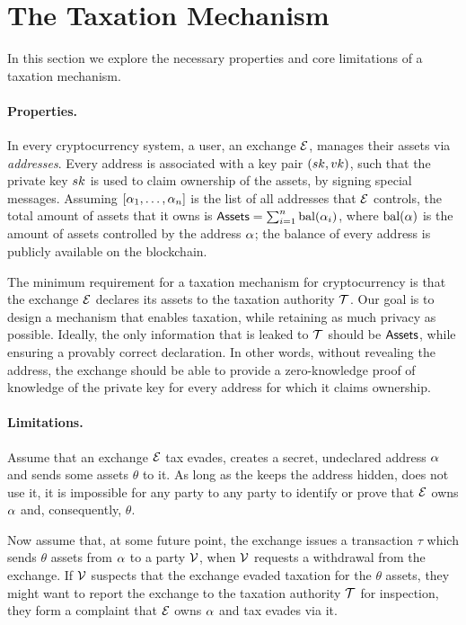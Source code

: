 \section{The Taxation Mechanism}\label{sec:taxation}

In this section we explore the necessary properties and core limitations of a
taxation mechanism.

\paragraph{Properties.}

In every cryptocurrency system, a user, \eg an exchange $\mathcal{E}$, manages
their assets via \emph{addresses}. Every address is associated with a key pair
$(sk, vk)$, such that the private key $sk$ is used to claim ownership of
the assets, \eg by signing special messages. Assuming $[\alpha_1, \dots,
\alpha_n]$ is the list of all addresses that $\mathcal{E}$ controls, the total
amount of assets that it owns is $\mathsf{Assets} = \sum_{i=1}^n
\text{bal}(\alpha_i)$, where $\text{bal}(\alpha)$ is the amount of assets
controlled by the address $\alpha$; the balance of every address is publicly
available on the blockchain.

The minimum requirement for a taxation mechanism for cryptocurrency is that the
exchange $\mathcal{E}$ declares its assets to the taxation authority $\mathcal{T}$.
Our goal is to design a mechanism that enables taxation, while retaining as
much privacy as possible. Ideally, the only information that is leaked to
$\mathcal{T}$ should be $\mathsf{Assets}$, while ensuring a provably correct declaration.
In other words, without revealing the address, the exchange should be able to
provide a zero-knowledge proof of knowledge of the private key for every
address for which it claims ownership.

\paragraph{Limitations.}

Assume that an exchange $\mathcal{E}$ tax evades, \ie creates a secret,
undeclared address $\alpha$ and sends some assets $\theta$ to it. As long as
the keeps the address hidden, \ie does not use it, it is impossible for any
party to any party to identify or prove that $\mathcal{E}$ owns $\alpha$ and,
consequently, $\theta$.

Now assume that, at some future point, the exchange issues a transaction $\tau$
which sends $\theta$ assets from $\alpha$ to a party $\mathcal{V}$, \eg when
$\mathcal{V}$ requests a withdrawal from the exchange. If $\mathcal{V}$ suspects that the
exchange evaded taxation for the $\theta$ assets, they might want to report the
exchange to the taxation authority $\mathcal{T}$ for inspection, \ie they form a
complaint that $\mathcal{E}$ owns $\alpha$ and tax evades via it.


